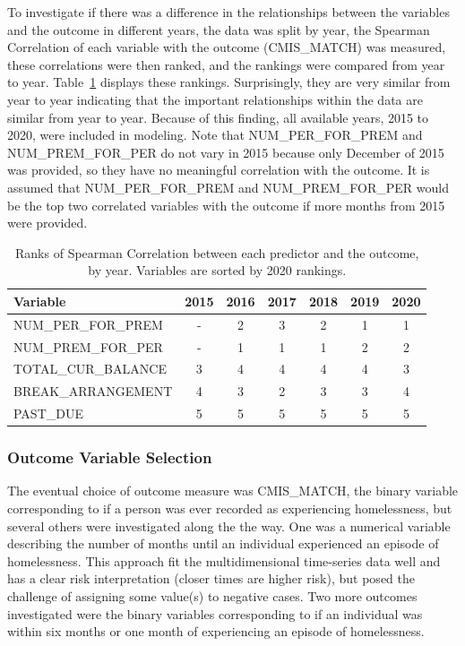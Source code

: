 \documentclass[10pt,letterpaper]{article}
\begin{document}
To investigate if there was a difference in the relationships between the variables and the outcome in different years, the data was split by year, the Spearman Correlation of each variable with the outcome (CMIS\_MATCH) was measured, these correlations were then ranked, and the rankings were compared from year to year. Table~\ref{tbl:corr_years} displays these rankings. Surprisingly, they are very similar from year to year indicating that the important relationships within the data are similar from year to year. Because of this finding, all available years, 2015 to 2020, were included in modeling. Note that NUM\_PER\_FOR\_PREM and NUM\_PREM\_FOR\_PER do not vary in 2015 because only December of 2015 was provided, so they have no meaningful correlation with the outcome. It is assumed that NUM\_PER\_FOR\_PREM and NUM\_PREM\_FOR\_PER would be the top two correlated variables with the outcome if more months from 2015 were provided.

\begin{table}[!h]
    \centering
    \begin{tabular}{lcccccc}
        \toprule
                 Variable &  2015 &  2016 &  2017 &  2018 &  2019 &  2020 \\
        \midrule
        NUM\_PER\_FOR\_PREM &     - &     2 &     3 &     2 &     1 &     1 \\
        NUM\_PREM\_FOR\_PER &     - &     1 &     1 &     1 &     2 &     2 \\
        TOTAL\_CUR\_BALANCE &     3 &     4 &     4 &     4 &     4 &     3 \\
        BREAK\_ARRANGEMENT  &     4 &     3 &     2 &     3 &     3 &     4 \\
        PAST\_DUE           &     5 &     5 &     5 &     5 &     5 &     5 \\
        \bottomrule
    \end{tabular}
\caption{Ranks of Spearman Correlation between each predictor and the outcome, by year. Variables are sorted by 2020 rankings.}
\label{tbl:corr_years}
\end{table}

\subsubsection*{Outcome Variable Selection}
The eventual choice of outcome measure was CMIS\_MATCH, the binary variable corresponding to if a person was ever recorded as experiencing homelessness, but several others were investigated along the the way. One was a numerical variable describing the number of months until an individual experienced an episode of homelessness. This approach fit the multidimensional time-series data well and has a clear risk interpretation (closer times are higher risk), but posed the challenge of assigning some value(s) to negative cases. Two more outcomes investigated were the binary variables corresponding to if an individual was within six months or one month of experiencing an episode of homelessness.
\end{document}
